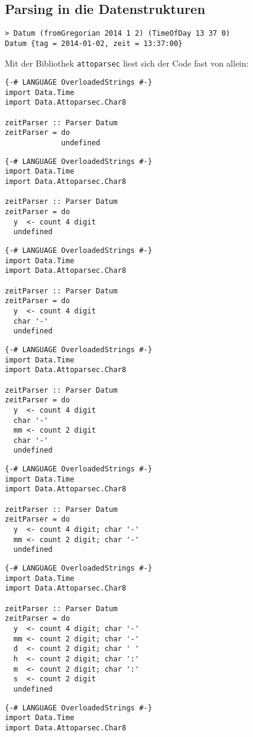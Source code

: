 \documentclass{beamer}
\begin{document}
\subsection{Parsing in die Datenstrukturen}
\begin{frame}[fragile]
\begin{verbatim}
> Datum (fromGregorian 2014 1 2) (TimeOfDay 13 37 0)
Datum {tag = 2014-01-02, zeit = 13:37:00}
\end{verbatim}
\pause
Mit der Bibliothek \texttt{attoparsec} liest sich der Code fast von allein:\bigskip

\begin{overprint}
\begin{verbatim}
{-# LANGUAGE OverloadedStrings #-}
import Data.Time
import Data.Attoparsec.Char8

zeitParser :: Parser Datum
zeitParser = do
             undefined
\end{verbatim}
\begin{verbatim}
{-# LANGUAGE OverloadedStrings #-}
import Data.Time
import Data.Attoparsec.Char8

zeitParser :: Parser Datum
zeitParser = do
  y  <- count 4 digit
  undefined
\end{verbatim}
\begin{verbatim}
{-# LANGUAGE OverloadedStrings #-}
import Data.Time
import Data.Attoparsec.Char8

zeitParser :: Parser Datum
zeitParser = do
  y  <- count 4 digit
  char '-'
  undefined
\end{verbatim}
\begin{verbatim}
{-# LANGUAGE OverloadedStrings #-}
import Data.Time
import Data.Attoparsec.Char8

zeitParser :: Parser Datum
zeitParser = do
  y  <- count 4 digit
  char '-'
  mm <- count 2 digit
  char '-'
  undefined
\end{verbatim}
\begin{verbatim}
{-# LANGUAGE OverloadedStrings #-}
import Data.Time
import Data.Attoparsec.Char8

zeitParser :: Parser Datum
zeitParser = do
  y  <- count 4 digit; char '-'
  mm <- count 2 digit; char '-'
  undefined
\end{verbatim}
\begin{verbatim}
{-# LANGUAGE OverloadedStrings #-}
import Data.Time
import Data.Attoparsec.Char8

zeitParser :: Parser Datum
zeitParser = do
  y  <- count 4 digit; char '-'
  mm <- count 2 digit; char '-'
  d  <- count 2 digit; char ' '
  h  <- count 2 digit; char ':'
  m  <- count 2 digit; char ':'
  s  <- count 2 digit
  undefined
\end{verbatim}
\begin{verbatim}
{-# LANGUAGE OverloadedStrings #-}
import Data.Time
import Data.Attoparsec.Char8


\end{verbatim}
\end{overprint}
\end{frame}
\end{document}
